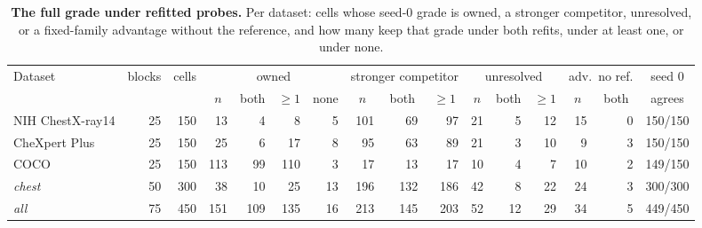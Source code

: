 \documentclass{article}
\begin{document}
\begin{table}[h]
\centering
\scriptsize
\setlength{\tabcolsep}{3pt}
\caption{\textbf{The full grade under refitted probes.} Per dataset: cells whose seed-0 grade is owned, a stronger competitor, unresolved, or a fixed-family advantage without the reference, and how many keep that grade under both refits, under at least one, or under none.}
\label{tab:cf-refit}
\begin{tabular}{lrrrrrrrrrrrrrrr}
\toprule
\multirow{2}{*}{Dataset} & \multirow{2}{*}{blocks} & \multirow{2}{*}{cells} & \multicolumn{4}{c}{owned} & \multicolumn{3}{c}{stronger competitor} & \multicolumn{3}{c}{unresolved} & \multicolumn{2}{c}{adv.\ no ref.} & \multicolumn{1}{c}{seed 0}\\
\cmidrule(lr){4-7}\cmidrule(lr){8-10}\cmidrule(lr){11-13}\cmidrule(lr){14-15}
 &  &  & \multicolumn{1}{c}{$n$} & \multicolumn{1}{c}{both} & \multicolumn{1}{c}{$\geq1$} & \multicolumn{1}{c}{none} & \multicolumn{1}{c}{$n$} & \multicolumn{1}{c}{both} & \multicolumn{1}{c}{$\geq1$} & \multicolumn{1}{c}{$n$} & \multicolumn{1}{c}{both} & \multicolumn{1}{c}{$\geq1$} & \multicolumn{1}{c}{$n$} & \multicolumn{1}{c}{both} & \multicolumn{1}{c}{agrees}\\
\midrule
NIH ChestX-ray14 & 25 & 150 & 13 & 4 & 8 & 5 & 101 & 69 & 97 & 21 & 5 & 12 & 15 & 0 & 150/150 \\
CheXpert Plus & 25 & 150 & 25 & 6 & 17 & 8 & 95 & 63 & 89 & 21 & 3 & 10 & 9 & 3 & 150/150 \\
COCO & 25 & 150 & 113 & 99 & 110 & 3 & 17 & 13 & 17 & 10 & 4 & 7 & 10 & 2 & 149/150 \\
\textit{chest} & 50 & 300 & 38 & 10 & 25 & 13 & 196 & 132 & 186 & 42 & 8 & 22 & 24 & 3 & 300/300 \\
\textit{all} & 75 & 450 & 151 & 109 & 135 & 16 & 213 & 145 & 203 & 52 & 12 & 29 & 34 & 5 & 449/450 \\
\bottomrule
\end{tabular}
\end{table}
\end{document}
